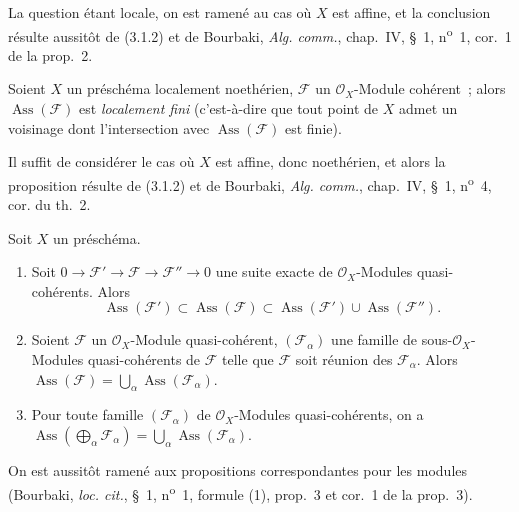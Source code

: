 La question étant locale, on est ramené au cas où $X$ est affine, et la
conclusion résulte aussitôt de (3.1.2) et de Bourbaki, \emph{Alg. comm.},
chap.~IV, \S~1, n\textsuperscript{o}~1, cor.~1 de la prop.~2.

\begin{proposition}[3.1.6]
\label{IV.2.3.1.6-fr}
Soient $X$ un préschéma localement noethérien, $\mathcal F$ un
$\mathcal O_X$-Module cohérent~; alors $\operatorname{Ass}(\mathcal F)$ est
\emph{localement fini} (c'est-à-dire que tout point de $X$ admet un voisinage
dont l'intersection avec $\operatorname{Ass}(\mathcal F)$ est finie).
\end{proposition}

Il suffit de considérer le cas où $X$ est affine, donc noethérien, et alors la
proposition résulte de (3.1.2) et de Bourbaki, \emph{Alg. comm.}, chap.~IV,
\S~1, n\textsuperscript{o}~4, cor. du th.~2.

\begin{proposition}[3.1.7]
\label{IV.2.3.1.7-fr}
Soit $X$ un préschéma.
\begin{enumerate}
\item[\emph{(i)}] Soit $0\to\mathcal F'\to\mathcal F\to\mathcal F''\to0$
une suite exacte de $\mathcal O_X$-Modules quasi-cohérents. Alors
\[
\operatorname{Ass}(\mathcal F')\subset\operatorname{Ass}(\mathcal F)
\subset\operatorname{Ass}(\mathcal F')\cup\operatorname{Ass}(\mathcal F'').
\]
\item[\emph{(ii)}] Soient $\mathcal F$ un $\mathcal O_X$-Module
quasi-cohérent, $(\mathcal F_\alpha)$ une famille de sous-$\mathcal O_X$-Modules
quasi-cohérents de $\mathcal F$ telle que $\mathcal F$ soit réunion des
$\mathcal F_\alpha$. Alors
$\operatorname{Ass}(\mathcal F)=\bigcup_\alpha\operatorname{Ass}(\mathcal F_\alpha)$.
\item[\emph{(iii)}] Pour toute famille $(\mathcal F_\alpha)$ de
$\mathcal O_X$-Modules quasi-cohérents, on a
$\operatorname{Ass}(\bigoplus_\alpha\mathcal F_\alpha)
=\bigcup_\alpha\operatorname{Ass}(\mathcal F_\alpha)$.
\end{enumerate}
\end{proposition}

On est aussitôt ramené aux propositions correspondantes pour les modules
(Bourbaki, \emph{loc. cit.}, \S~1, n\textsuperscript{o}~1, formule (1), prop.~3
et cor.~1 de la prop.~3).

